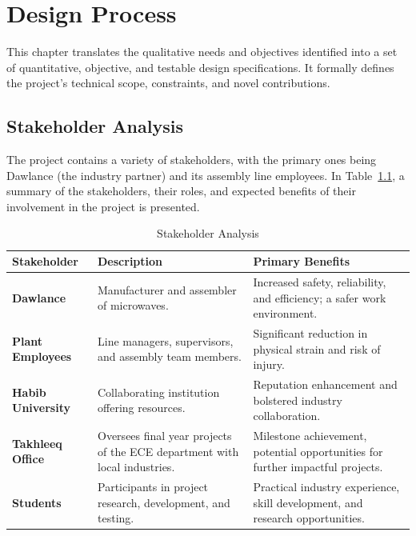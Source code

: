 \chapter{Design Process}

This chapter translates the qualitative needs and objectives identified into a set of quantitative, objective, and testable design specifications. It formally defines the project's technical scope, constraints, and novel contributions.

\section{Stakeholder Analysis}

The project contains a variety of stakeholders, with the primary ones being Dawlance (the industry partner) and its assembly line employees. In Table~\ref{tab:stakeholders}, a summary of the stakeholders, their roles, and expected benefits of their involvement in the project is presented.

\begin{table}[H]
  \centering
  \caption{Stakeholder Analysis}
  \label{tab:stakeholders}
  \renewcommand{\arraystretch}{1.3}
  \begin{tabular}{@{}l p{5cm} p{5cm}@{}}
    \toprule
    \textbf{Stakeholder} & \textbf{Description} & \textbf{Primary Benefits} \\
    \midrule
    \textbf{Dawlance} & Manufacturer and assembler of microwaves. & Increased safety, reliability, and efficiency; a safer work environment. \\
    \hline
    \textbf{Plant Employees} & Line managers, supervisors, and assembly team members. & Significant reduction in physical strain and risk of injury. \\
    \hline
    \textbf{Habib University} & Collaborating institution offering resources. & Reputation enhancement and bolstered industry collaboration. \\
    \hline
    \textbf{Takhleeq Office} & Oversees final year projects of the ECE department with local industries. & Milestone achievement, potential opportunities for further impactful projects. \\
    \hline
    \textbf{Students} & Participants in project research, development, and testing. & Practical industry experience, skill development, and research opportunities. \\
    \bottomrule
  \end{tabular}
\end{table}

